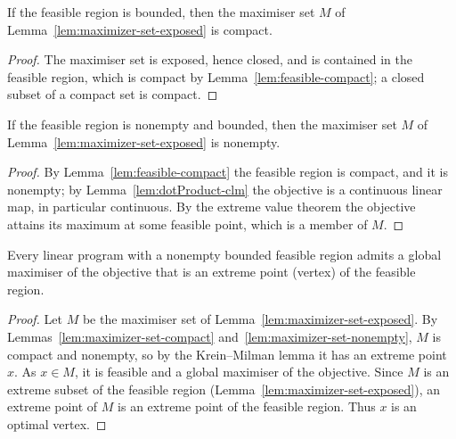 \begin{lemma}
    \label{lem:maximizer-set-compact}
    \leanok
    If the feasible region is bounded, then the maximiser set $M$ of
    Lemma~\ref{lem:maximizer-set-exposed} is compact.
\end{lemma}
\begin{proof}
    The maximiser set is exposed, hence closed, and is contained in the feasible
    region, which is compact by Lemma~\ref{lem:feasible-compact}; a closed subset
    of a compact set is compact.
\end{proof}

\begin{lemma}
    \label{lem:maximizer-set-nonempty}
    \leanok
    If the feasible region is nonempty and bounded, then the maximiser set $M$
    of Lemma~\ref{lem:maximizer-set-exposed} is nonempty.
\end{lemma}
\begin{proof}
    By Lemma~\ref{lem:feasible-compact} the feasible region is compact, and it is
    nonempty; by Lemma~\ref{lem:dotProduct-clm} the objective is a continuous
    linear map, in particular continuous. By the extreme value theorem the
    objective attains its maximum at some feasible point, which is a member of
    $M$.
\end{proof}

\begin{theorem}
    \label{thm:simplex-algorithm}
    \leanok
    Every linear program with a nonempty bounded feasible region admits a global
    maximiser of the objective that is an extreme point (vertex) of the feasible
    region.
\end{theorem}
\begin{proof}
    Let $M$ be the maximiser set of Lemma~\ref{lem:maximizer-set-exposed}. By
    Lemmas~\ref{lem:maximizer-set-compact} and~\ref{lem:maximizer-set-nonempty},
    $M$ is compact and nonempty, so by the Krein--Milman lemma it has an extreme
    point $x$. As $x \in M$, it is feasible and a global maximiser of the
    objective. Since $M$ is an extreme subset of the feasible region
    (Lemma~\ref{lem:maximizer-set-exposed}), an extreme point of $M$ is an extreme
    point of the feasible region. Thus $x$ is an optimal vertex.
\end{proof}
